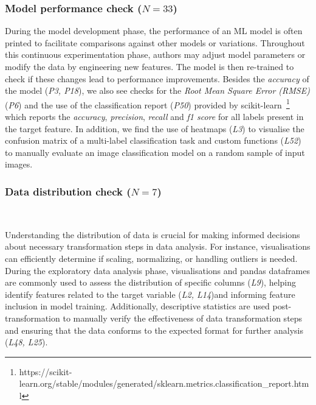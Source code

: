 \subsubsection{Model performance check ($N = 33$)}

During the model development phase, the performance of an ML model is often printed to facilitate comparisons against other models or variations. Throughout this continuous experimentation phase, authors may adjust model parameters or modify the data by engineering new features. The model is then re-trained to check if these changes lead to performance improvements. Besides the \emph{accuracy} of the model (\emph{P3, P18}), we also see checks for the \emph{Root Mean Square Error (RMSE)} (\emph{P6}) and the use of the classification report (\emph{P50}) provided by scikit-learn~\footnote{https://scikit-learn.org/stable/modules/generated/sklearn.metrics.classification\_report.html} which reports the \emph{accuracy}, \emph{precision}, \emph{recall} and \emph{f1 score} for all labels present in the target feature. In addition, we find the use of heatmaps (\emph{L3}) to visualise the confusion matrix of a multi-label classification task and custom functions (\emph{L52}) to manually evaluate an image classification model on a random sample of input images.


\subsubsection{Data distribution check ($N = 7$)}~\label{sec:data-distribution-output}

Understanding the distribution of data is crucial for making informed decisions about necessary transformation steps in data analysis. For instance, visualisations can efficiently determine if scaling, normalizing, or handling outliers is needed. During the exploratory data analysis phase, visualisations and pandas dataframes are commonly used to assess the distribution of specific columns (\emph{L9}), helping identify features related to the target variable (\emph{L2, L14})and informing feature inclusion in model training. Additionally, descriptive statistics are used post-transformation to manually verify the effectiveness of data transformation steps and ensuring that the data conforms to the expected format for further analysis (\emph{L48, L25}).

